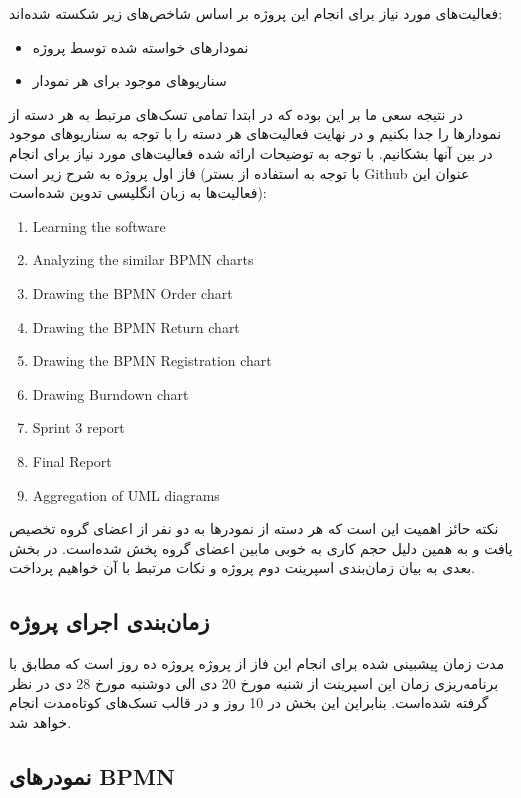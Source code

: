 \documentclass[]{article}
\begin{document}
فعالیت‌های مورد نیاز برای انجام این پروژه بر اساس شاخص‌های زیر شکسته
شده‌اند:

\begin{itemize}
\item
  نمودارهای خواسته شده توسط پروژه
\item
  سناریوهای موجود برای هر نمودار
\end{itemize}

در نتیجه سعی ما بر این بوده که در ابتدا تمامی تسک‌های مرتبط به هر دسته
از نمودارها را جدا بکنیم و در نهایت فعالیت‌های هر دسته را با توجه به
سناریوهای موجود در بین آنها بشکانیم. با توجه به توضیحات ارائه شده
فعالیت‌های مورد نیاز برای انجام فاز اول پروژه به شرح زیر است (با توجه به
استفاده از بستر Github عنوان این فعالیت‌ها به زبان انگلیسی تدوین
شده‌است):

\begin{enumerate}
\def\labelenumi{\arabic{enumi})}
\item
  Learning the software
\item
  Analyzing the similar BPMN charts
\item
  Drawing the BPMN Order chart
\item
  Drawing the BPMN Return chart
\item
  Drawing the BPMN Registration chart
\item
  Drawing Burndown chart
\item
  Sprint 3 report
\item
  Final Report
\item
  Aggregation of UML diagrams
\end{enumerate}

نکته حائز اهمیت این است که هر دسته از نمودرها به دو نفر از اعضای گروه
تخصیص یافت و به همین دلیل حجم کاری به خوبی مابین اعضای گروه پخش شده‌است.
در بخش بعدی به بیان زمان‌بندی اسپرینت دوم پروژه و نکات مرتبط با آن
خواهیم پرداخت.

\subsection{زمان‌بندی اجرای
پروژه}\label{ux632ux645ux627ux646ux628ux646ux62fux6cc-ux627ux62cux631ux627ux6cc-ux67eux631ux648ux698ux647}

مدت زمان پیشبینی شده برای انجام این فاز از پروژه پروژه ده روز است که
مطابق با برنامه‌ریزی زمان این اسپرینت از شنبه مورخ 20 دی الی دوشنبه مورخ
28 دی در نظر گرفته شده‌است. بنابراین این بخش در 10 روز و در قالب تسک‌های
کوتاه‌مدت انجام خواهد شد.

\subsection{نمودرهای
BPMN}\label{ux646ux645ux648ux62fux631ux647ux627ux6cc-bpmn}
\end{document}
